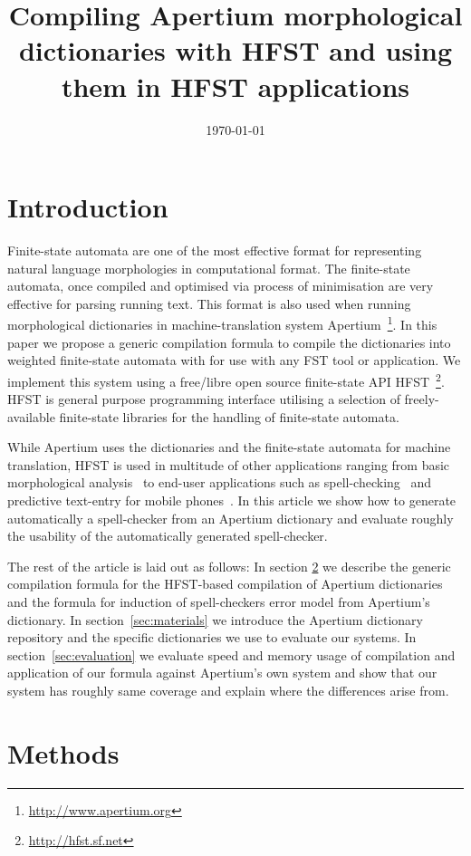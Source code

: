 \documentclass[a4paper]{article}
\title{Compiling Apertium morphological dictionaries with HFST and using them
in HFST applications}
\date{\today}
\begin{document}
\maketitleabstract

\section{Introduction}

Finite-state automata are one of the most effective format for representing
natural language morphologies in computational format. The finite-state
automata, once compiled and optimised via process of minimisation are very
effective for parsing running text. This format is also used when running
morphological dictionaries in machine-translation system
Apertium~\cite{Apertium/2011}\footnote{\url{http://www.apertium.org}}. In this
paper we propose a generic compilation formula  to compile the
dictionaries into weighted finite-state automata with for use with any FST 
tool or application.  We implement this system using a free/libre
open source finite-state API
HFST~\cite{hfst/2011}\footnote{\url{http://hfst.sf.net}}. HFST is general
purpose programming interface utilising a selection of freely-available
finite-state libraries for the handling of finite-state automata.

While Apertium uses the dictionaries and the finite-state automata for machine
translation, HFST is used in multitude of other applications ranging from
basic morphological analysis~\cite{hfst/2011}
to end-user applications such as spell-checking~\cite{pirinen/2010/lrec} and
predictive text-entry for mobile phones~\cite{silfverberg/2011/cla}. In this
article we show how to generate automatically a spell-checker from an Apertium
dictionary and evaluate roughly the usability of the automatically generated
spell-checker.

The rest of the article is laid out as follows: In section \ref{sec:methods}
we describe the generic compilation formula for the HFST-based compilation of
Apertium dictionaries and the formula for induction of spell-checkers error
model from Apertium's dictionary. In section~\ref{sec:materials} we introduce
the Apertium dictionary repository and the specific dictionaries we use to
evaluate our systems. In section~\ref{sec:evaluation} we evaluate speed and
memory usage of compilation and application of our formula against Apertium's
own system and show that our system has roughly same coverage and explain
where the differences arise from.

\section{Methods}
\label{sec:methods}
\end{document}
